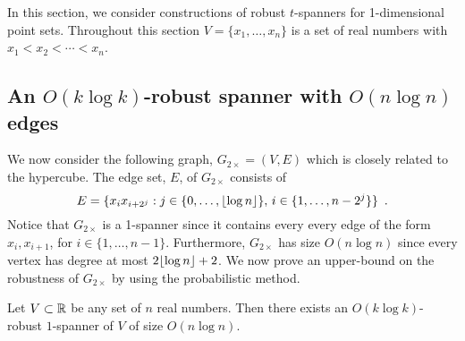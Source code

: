 \documentclass{patmorin}
\begin{document}
In this section, we consider constructions of robust $t$-spanners for
1-dimensional point sets.  Throughout this section $V=\{x_1,\ldots,x_n\}$
is a set of real numbers with $x_1<x_2<\cdots<x_n$.

\subsection{An $O(k\log k)$-robust spanner with $O(n\log n)$ edges}

We now consider the following graph, $G_{2\times}=(V,E)$ which is
closely related to the hypercube.   The edge set, $E$, of $G_{2\times}$
consists of
\[
  E = \{x_ix_{i+2^j} : j\in\{0,\ldots,{\lfloor \log n \rfloor}\},\, 
        i\in\{1,\ldots,n-2^j\} \} \enspace .
\] 
Notice that $G_{2\times}$ is a 1-spanner since it contains every every
edge of the form $x_i,x_{i+1}$, for $i\in\{1,\ldots,n-1\}$. Furthermore,
$G_{2\times}$ has size $O(n\log n)$ since every vertex has degree at most
$2{\lfloor \log n \rfloor}+2$.  We now prove an upper-bound on the robustness of
$G_{2\times}$ by using the probabilistic method.

\begin{thm}
  Let $V\subset \mathbb{R}$ be any set of $n$ real numbers.  Then there exists
  an $O(k\log k)$-robust $1$-spanner of $V$ of size $O(n\log n)$.
\end{thm}
\end{document}
